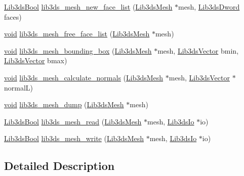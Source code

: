 \begin{DoxyCompactItemize}
\item 
\hyperlink{types_8h_a89dd7398a9ebbbf28011f8c32df67ad3}{Lib3ds\-Bool} \hyperlink{group__mesh_gacf6978458c8d2ddfe34048ba5aa3e48b}{lib3ds\-\_\-mesh\-\_\-new\-\_\-face\-\_\-list} (\hyperlink{struct_lib3ds_mesh}{Lib3ds\-Mesh} $\ast$mesh, \hyperlink{types_8h_a299c9663303144c562f6bd92c2f273d3}{Lib3ds\-Dword} faces)
\item 
\hyperlink{group___u_a_v_objects_plugin_ga444cf2ff3f0ecbe028adce838d373f5c}{void} \hyperlink{group__mesh_gaff057c8d175e319ce3e4f02ef2287ca6}{lib3ds\-\_\-mesh\-\_\-free\-\_\-face\-\_\-list} (\hyperlink{struct_lib3ds_mesh}{Lib3ds\-Mesh} $\ast$mesh)
\item 
\hyperlink{group___u_a_v_objects_plugin_ga444cf2ff3f0ecbe028adce838d373f5c}{void} \hyperlink{group__mesh_gafb6f23418a8ce0f6aaa85923463cad56}{lib3ds\-\_\-mesh\-\_\-bounding\-\_\-box} (\hyperlink{struct_lib3ds_mesh}{Lib3ds\-Mesh} $\ast$mesh, \hyperlink{group__vector_ga6ac1c3b3ef15381ebf6baf264d658dcf}{Lib3ds\-Vector} bmin, \hyperlink{group__vector_ga6ac1c3b3ef15381ebf6baf264d658dcf}{Lib3ds\-Vector} bmax)
\item 
\hyperlink{group___u_a_v_objects_plugin_ga444cf2ff3f0ecbe028adce838d373f5c}{void} \hyperlink{group__mesh_gad76dc09dc12d1ef5e3a02ff8449749c0}{lib3ds\-\_\-mesh\-\_\-calculate\-\_\-normals} (\hyperlink{struct_lib3ds_mesh}{Lib3ds\-Mesh} $\ast$mesh, \hyperlink{group__vector_ga6ac1c3b3ef15381ebf6baf264d658dcf}{Lib3ds\-Vector} $\ast$normal\-L)
\item 
\hyperlink{group___u_a_v_objects_plugin_ga444cf2ff3f0ecbe028adce838d373f5c}{void} \hyperlink{group__mesh_ga9edfbdf4d2bb0742124595dc417d4954}{lib3ds\-\_\-mesh\-\_\-dump} (\hyperlink{struct_lib3ds_mesh}{Lib3ds\-Mesh} $\ast$mesh)
\item 
\hyperlink{types_8h_a89dd7398a9ebbbf28011f8c32df67ad3}{Lib3ds\-Bool} \hyperlink{group__mesh_gab897e43c2c62a7b36c8d04654860bef9}{lib3ds\-\_\-mesh\-\_\-read} (\hyperlink{struct_lib3ds_mesh}{Lib3ds\-Mesh} $\ast$mesh, \hyperlink{struct_lib3ds_io}{Lib3ds\-Io} $\ast$io)
\item 
\hyperlink{types_8h_a89dd7398a9ebbbf28011f8c32df67ad3}{Lib3ds\-Bool} \hyperlink{group__mesh_gacb38fcbccbfd471479cc8717f51a5873}{lib3ds\-\_\-mesh\-\_\-write} (\hyperlink{struct_lib3ds_mesh}{Lib3ds\-Mesh} $\ast$mesh, \hyperlink{struct_lib3ds_io}{Lib3ds\-Io} $\ast$io)
\end{DoxyCompactItemize}


\subsection{Detailed Description}


